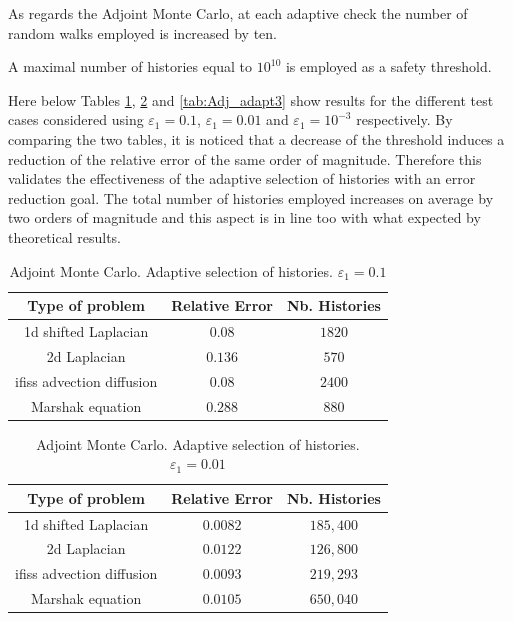 \documentclass[a4paper,10pt]{article}
\begin{document}
As regards the Adjoint Monte Carlo, at each adaptive check the number of 
random walks employed is increased by ten.  

A maximal number of histories equal to $10^10$ is employed as a safety 
threshold.

Here below Tables \ref{tab:Adj_adapt}, \ref{tab:Adj_adapt2} and 
\ref{tab:Adj_adapt3} show results 
for the different test cases 
considered using $\varepsilon_1=0.1$, $\varepsilon_1=0.01$ and 
$\varepsilon_1=10^{-3}$ respectively.
By comparing the two tables, it is noticed that a decrease of the threshold 
induces a reduction of the relative error of the same order of magnitude. 
Therefore this validates 
the effectiveness of the adaptive selection of histories with an error 
reduction goal. The total number of histories employed increases on average by 
two orders of magnitude and this aspect is in line too with what expected by 
theoretical results.

\begin{table}[!h]
\centering
\begin{tabular}{|c|c|c|}
\hline
\textbf{Type of problem} & \textbf{Relative Error} &\textbf{Nb. Histories}\\
\hline
1d shifted Laplacian & $0.08$ & $1820$\\
\hline 
2d Laplacian & $0.136$ & $570$\\
\hline
ifiss advection diffusion & $0.08$  & $2400$\\
\hline
Marshak equation & $0.288$ & $880$\\
\hline
\end{tabular}
\caption{Adjoint Monte Carlo. Adaptive selection of histories. 
$\varepsilon_1=0.1$} 
\label{tab:Adj_adapt}
\end{table}

\begin{table}[!h]
\centering
\begin{tabular}{|c|c|c|}
\hline
\textbf{Type of problem} & \textbf{Relative Error} &\textbf{Nb. Histories}\\
\hline
1d shifted Laplacian & $0.0082$ & $185,400$\\
\hline 
2d Laplacian & $0.0122$ & $126,800$\\
\hline
ifiss advection diffusion & $0.0093$  & $219,293$\\
\hline
Marshak equation & $0.0105$ & $650,040$\\
\hline
\end{tabular}
\caption{Adjoint Monte Carlo. Adaptive selection of histories. 
$\varepsilon_1=0.01$} 
\label{tab:Adj_adapt2}
\end{table}
\end{document}
